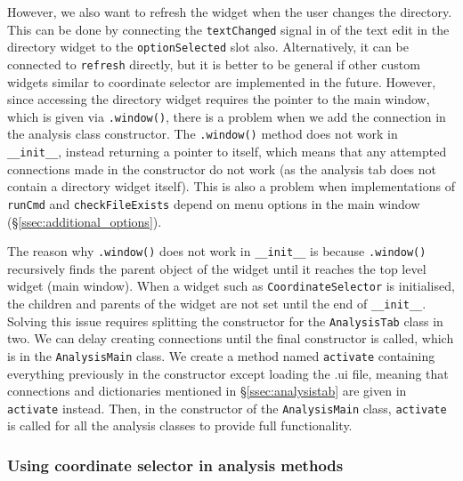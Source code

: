 \documentclass[12pt]{article}
\begin{document}
However, we also want to refresh the widget when the user changes the directory. This can be done by connecting the \texttt{textChanged} signal in of the text edit in the directory widget to the \texttt{optionSelected} slot also. Alternatively, it can be connected to \texttt{refresh} directly, but it is better to be general if other custom widgets similar to coordinate selector are implemented in the future. However, since accessing the directory widget requires the pointer to the main window, which is given via \texttt{.window()}, there is a problem when we add the connection in the analysis class constructor. The \texttt{.window()} method does not work in \texttt{\_\_init\_\_}, instead returning a pointer to itself, which means that any attempted connections made in the constructor do not work (as the analysis tab does not contain a directory widget itself). This is also a problem when implementations of \texttt{runCmd} and \texttt{checkFileExists} depend on menu options in the main window (\S\ref{ssec:additional_options}).

The reason why \texttt{.window()} does not work in \texttt{\_\_init\_\_} is because \texttt{.window()} recursively finds the parent object of the widget until it reaches the top level widget (main window). When a widget such as \texttt{CoordinateSelector} is initialised, the children and parents of the widget are not set until the end of \texttt{\_\_init\_\_}. Solving this issue requires splitting the constructor for the \texttt{AnalysisTab} class in two. We can delay creating connections until the final constructor is called, which is in the \texttt{AnalysisMain} class. We create a method named \texttt{activate} containing everything previously in the constructor except loading the .ui file, meaning that connections and dictionaries mentioned in \S\ref{ssec:analysistab} are given in \texttt{activate} instead. Then, in the constructor of the \texttt{AnalysisMain} class, \texttt{activate} is called for all the analysis classes to provide full functionality.

\subsubsection{Using coordinate selector in analysis methods}
\end{document}
